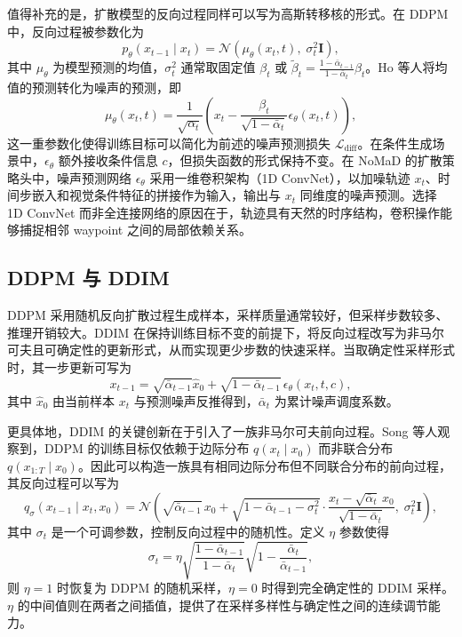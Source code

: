值得补充的是，扩散模型的反向过程同样可以写为高斯转移核的形式。在 DDPM 中，反向过程被参数化为
\begin{equation}
p_\theta(x_{t-1} \mid x_t) = \mathcal{N}\!\left(\mu_\theta(x_t, t),\; \sigma_t^2 \mathbf{I}\right),
\end{equation}
其中 $\mu_\theta$ 为模型预测的均值，$\sigma_t^2$ 通常取固定值 $\beta_t$ 或 $\tilde\beta_t = \frac{1-\bar\alpha_{t-1}}{1-\bar\alpha_t}\beta_t$。Ho 等人\cite{ddpm2020}将均值的预测转化为噪声的预测，即
\begin{equation}
\mu_\theta(x_t, t) = \frac{1}{\sqrt{\alpha_t}}\left(x_t - \frac{\beta_t}{\sqrt{1-\bar\alpha_t}}\epsilon_\theta(x_t, t)\right),
\end{equation}
这一重参数化使得训练目标可以简化为前述的噪声预测损失 $\mathcal{L}_{\text{diff}}$。在条件生成场景中，$\epsilon_\theta$ 额外接收条件信息 $c$，但损失函数的形式保持不变。在 NoMaD 的扩散策略头中，噪声预测网络 $\epsilon_\theta$ 采用一维卷积架构（1D ConvNet），以加噪轨迹 $x_t$、时间步嵌入和视觉条件特征的拼接作为输入，输出与 $x_t$ 同维度的噪声预测。选择 1D ConvNet 而非全连接网络的原因在于，轨迹具有天然的时序结构，卷积操作能够捕捉相邻 waypoint 之间的局部依赖关系。

\subsection{DDPM 与 DDIM}

DDPM 采用随机反向扩散过程生成样本，采样质量通常较好，但采样步数较多、推理开销较大\cite{ddpm2020}。DDIM 在保持训练目标不变的前提下，将反向过程改写为非马尔可夫且可确定性的更新形式，从而实现更少步数的快速采样\cite{ddim2020}。当取确定性采样形式时，其一步更新可写为
\begin{equation}
x_{t-1} = \sqrt{\bar\alpha_{t-1}}\hat x_0 + \sqrt{1-\bar\alpha_{t-1}}\,\epsilon_\theta(x_t,t,c),
\end{equation}
其中 $\hat x_0$ 由当前样本 $x_t$ 与预测噪声反推得到，$\bar\alpha_t$ 为累计噪声调度系数。

更具体地，DDIM 的关键创新在于引入了一族非马尔可夫前向过程。Song 等人\cite{ddim2020}观察到，DDPM 的训练目标仅依赖于边际分布 $q(x_t \mid x_0)$ 而非联合分布 $q(x_{1:T} \mid x_0)$。因此可以构造一族具有相同边际分布但不同联合分布的前向过程，其反向过程可以写为
\begin{equation}
q_\sigma(x_{t-1} \mid x_t, x_0) = \mathcal{N}\!\left(\sqrt{\bar\alpha_{t-1}}\, x_0 + \sqrt{1-\bar\alpha_{t-1}-\sigma_t^2}\cdot\frac{x_t - \sqrt{\bar\alpha_t}\, x_0}{\sqrt{1-\bar\alpha_t}},\; \sigma_t^2 \mathbf{I}\right),
\end{equation}
其中 $\sigma_t$ 是一个可调参数，控制反向过程中的随机性。定义 $\eta$ 参数使得
\begin{equation}
\sigma_t =
\eta
\sqrt{\frac{1-\bar\alpha_{t-1}}{1-\bar\alpha_t}}
\sqrt{1-\frac{\bar\alpha_t}{\bar\alpha_{t-1}}},
\end{equation}
则 $\eta = 1$ 时恢复为 DDPM 的随机采样，$\eta = 0$ 时得到完全确定性的 DDIM 采样。$\eta$ 的中间值则在两者之间插值，提供了在采样多样性与确定性之间的连续调节能力。

